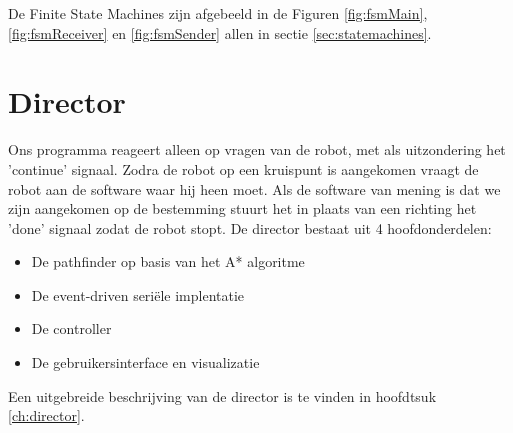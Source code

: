 \documentclass{report}
\begin{document}
De Finite State Machines zijn afgebeeld in de Figuren \ref{fig:fsmMain}, \ref{fig:fsmReceiver} en \ref{fig:fsmSender} allen in sectie \ref{sec:statemachines}.

\section{Director}
Ons programma reageert alleen op vragen van de robot, met als uitzondering het 'continue' signaal.
Zodra de robot op een kruispunt is aangekomen vraagt de robot aan de software waar hij heen moet.
Als de software van mening is dat we zijn aangekomen op de bestemming stuurt het in plaats van een richting het 'done' signaal zodat de robot stopt.
De director bestaat uit 4 hoofdonderdelen:
\begin{itemize}
\item De pathfinder op basis van het A* algoritme
\item De event-driven seriële implentatie
\item De controller
\item De gebruikersinterface en visualizatie
\end{itemize}
Een uitgebreide beschrijving van de director is te vinden in hoofdtsuk \ref{ch:director}.
\end{document}
